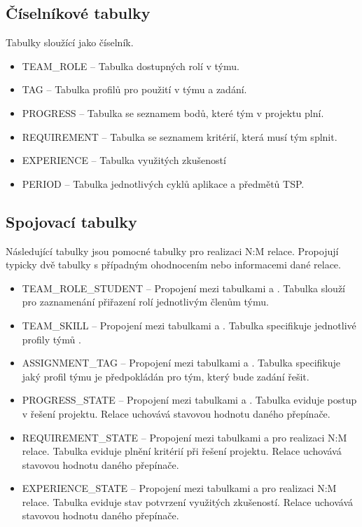 \documentclass[czech,BP]{thesiskiv}
\begin{document}
		\subsection{Číselníkové tabulky}
		\par Tabulky sloužící jako číselník.
		\begin{itemize}
			\item TEAM\_ROLE -- Tabulka dostupných rolí v týmu.
			\item TAG -- Tabulka profilů pro použití v týmu a zadání.
			\item PROGRESS -- Tabulka se seznamem bodů, které tým v projektu plní.
			\item REQUIREMENT -- Tabulka se seznamem kritérií, která musí tým splnit.
			\item EXPERIENCE -- Tabulka využitých zkušeností
			\item PERIOD -- Tabulka jednotlivých cyklů aplikace a předmětů TSP.
		\end{itemize}
		\subsection{Spojovací tabulky}
			\par Následující tabulky jsou pomocné tabulky pro realizaci N:M relace. Propojují typicky dvě tabulky s případným ohodnocením nebo informacemi dané relace.
			\begin{itemize}
				\item TEAM\_ROLE\_STUDENT -- Propojení mezi tabulkami  a . Tabulka slouží pro zaznamenání přiřazení rolí jednotlivým členům týmu.
				\item TEAM\_SKILL -- Propojení mezi tabulkami  a . Tabulka specifikuje jednotlivé profily týmů .
				\item ASSIGNMENT\_TAG -- Propojení mezi tabulkami  a . Tabulka specifikuje jaký profil týmu je předpokládán pro tým, který bude zadání řešit.
				\item PROGRESS\_STATE -- Propojení mezi tabulkami  a . Tabulka eviduje postup v řešení projektu. Relace uchovává stavovou hodnotu daného přepínače.
				\item REQUIREMENT\_STATE -- Propojení mezi tabulkami  a  pro realizaci N:M relace. Tabulka eviduje plnění kritérií při řešení projektu. Relace uchovává stavovou hodnotu daného přepínače.
				\item EXPERIENCE\_STATE -- Propojení mezi tabulkami  a  pro realizaci N:M relace. Tabulka eviduje stav potvrzení využitých zkušeností. Relace uchovává stavovou hodnotu daného přepínače.
			\end{itemize}
\end{document}
